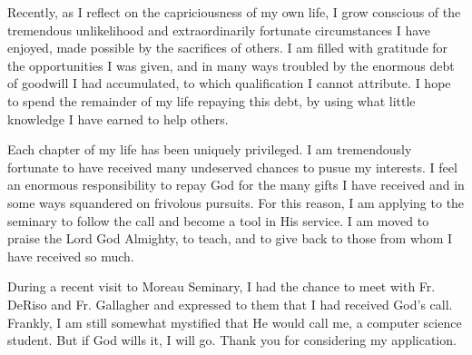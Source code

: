 \documentclass[11pt]{article}
\begin{document}
Recently, as I reflect on the capriciousness of my own life, I grow conscious of the tremendous unlikelihood and extraordinarily fortunate circumstances I have enjoyed, made possible by the sacrifices of others. I am filled with gratitude for the opportunities I was given, and in many ways troubled by the enormous debt of goodwill I had accumulated, to which qualification I cannot attribute. I hope to spend the remainder of my life repaying this debt, by using what little knowledge I have earned to help others.

Each chapter of my life has been uniquely privileged. I am tremendously fortunate to have received many undeserved chances to pusue my interests. I feel an enormous responsibility to repay God for the many gifts I have received and in some ways squandered on frivolous pursuits. For this reason, I am applying to the seminary to follow the call and become a tool in His service. I am moved to praise the Lord God Almighty, to teach, and to give back to those from whom I have received so much.

During a recent visit to Moreau Seminary, I had the chance to meet with Fr. DeRiso and Fr. Gallagher and expressed to them that I had received God's call. Frankly, I am still somewhat mystified that He would call me, a computer science student. But if God wills it, I will go. Thank you for considering my application.
\end{document}
